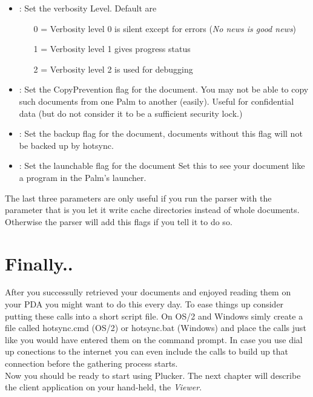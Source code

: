 \begin{itemize}
\item {}: Set the verbosity Level. Default are
  \begin{itemize}
   \item[0] = Verbosity level 0 is silent except for errors
   (\emph{No news is good news})
   \item[1] = Verbosity level 1 gives progress status
   \item[2] = Verbosity level 2 is used for debugging
  \end{itemize}
  \item {}: Set the CopyPrevention flag for the
        document. You may not be able to copy such documents from
        one Palm to another (easily). Useful for confidential data
        (but do not consider it to be a sufficient security lock.)
  \item {}: Set the backup flag for the document,
        documents without this flag will not be backed up by hotsync.
  \item {}: Set the launchable flag for the document
Set this to see your document like a program in the Palm's launcher.
\end{itemize}
\note The last three parameters are only useful if you run the parser
with the  parameter that is you let it write cache
directories instead of whole documents. Otherwise the parser will add
this flags if you tell it to do so.

\section{Finally..}

After you successully retrieved your documents and enjoyed reading
them on your PDA you might want to do this every day. To ease things
up consider putting these calls into a short script file. On OS/2 and
Windows simly create a file called hotsync.cmd (OS/2) or hotsync.bat
(Windows) and place the calls just like you would have entered them on
the command prompt. In case you use dial up conections to the internet
you can even include the calls to build up that connection before the
gathering process starts.\\

Now you should be ready to start using Plucker. The next chapter will
describe the client application on your hand-held, the \emph{Viewer}.
